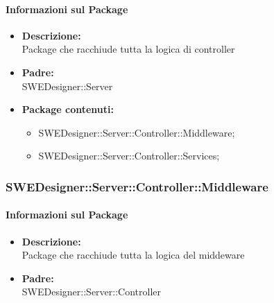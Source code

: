 		\paragraph{Informazioni sul Package}
		\begin{itemize}				
			\item \textbf{Descrizione: }\\
			Package che racchiude tutta la logica di controller
			\item \textbf{Padre: }\\ SWEDesigner::Server
			\item \textbf{Package contenuti: }
			\begin{itemize}
				\item SWEDesigner::Server::Controller::Middleware;
				\item SWEDesigner::Server::Controller::Services;
			\end{itemize}
		\end{itemize}
		
		\subsubsection{SWEDesigner::Server::Controller::Middleware}
		\paragraph{Informazioni sul Package}
		\begin{itemize}				
			\item \textbf{Descrizione: }\\
			Package che racchiude tutta la logica del middeware
			\item \textbf{Padre: }\\ SWEDesigner::Server::Controller
		\end{itemize}
